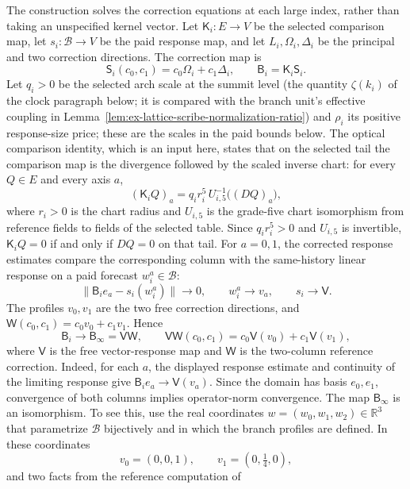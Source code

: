 The construction solves the correction equations at each
large index, rather than taking an unspecified kernel vector. Let
$\mathsf K_i:E\to V$ be the selected comparison map, let
$s_i:\mathcal B\to V$ be the paid response map, and let
$L_i,\Omega_i,\Delta_i$ be the
principal and two correction directions. The correction map is
\[
 \mathsf S_i(c_0,c_1)=c_0\Omega_i+c_1\Delta_i,
 \qquad \mathsf B_i=\mathsf K_i\mathsf S_i.
\]
Let $q_i>0$ be the selected arch scale at the summit level (the
quantity $\zeta(k_i)$ of the clock paragraph below; it is compared with
the branch unit's effective coupling in
Lemma~\ref{lem:ex-lattice-scribe-normalization-ratio}) and $\rho_i$ its
positive response-size price; these are the scales in the paid bounds below.
The optical comparison identity, which is an input here, states that on
the selected tail the comparison map is the divergence followed by the
scaled inverse chart: for every $Q\in E$ and every axis $a$,
\begin{equation}
 (\mathsf K_iQ)_a=q_ir_i^5\,U_{i,5}^{-1}\bigl((DQ)_a\bigr),
 \label{eq:ex-lattice-scribe-optical-identity}
\end{equation}
where $r_i>0$ is the chart radius and $U_{i,5}$ is the grade-five chart
isomorphism from reference fields to fields of the selected table. Since
$q_ir_i^5>0$ and $U_{i,5}$ is invertible, $\mathsf K_iQ=0$ if and only if
$DQ=0$ on that tail.
For $a=0,1$, the corrected response estimates compare the corresponding
column with the same-history linear response on a paid forecast
$w_i^a\in\mathcal B$:
\[
 \|\mathsf B_i e_a-s_i(w_i^a)\|\longrightarrow0,
 \qquad w_i^a\longrightarrow v_a,
 \qquad s_i\longrightarrow\mathsf V.
\]
The profiles $v_0,v_1$ are the two free correction directions, and
$\mathsf W(c_0,c_1)=c_0v_0+c_1v_1$. Hence
\[
 \mathsf B_i\longrightarrow
 \mathsf B_\infty=\mathsf V\mathsf W,
 \qquad
 \mathsf V\mathsf W(c_0,c_1)=c_0\mathsf V(v_0)+c_1\mathsf V(v_1),
\]
where $\mathsf V$ is the free vector-response map and $\mathsf W$ is the
two-column reference correction. Indeed, for each $a$, the displayed
response estimate and continuity of the limiting response give
$\mathsf B_i e_a\to\mathsf V(v_a)$. Since the domain has basis
$e_0,e_1$, convergence of both columns implies operator-norm convergence.
The map $\mathsf B_\infty$ is an isomorphism. To see this, use the real
coordinates $w=(w_0,w_1,w_2)\in\mathbb R^3$ that parametrize
$\mathcal B$ bijectively and in which the branch profiles are defined.
In these coordinates
\[
 v_0=(0,0,1),\qquad v_1=(0,\tfrac14,0),
\]
and two facts from the reference computation of
